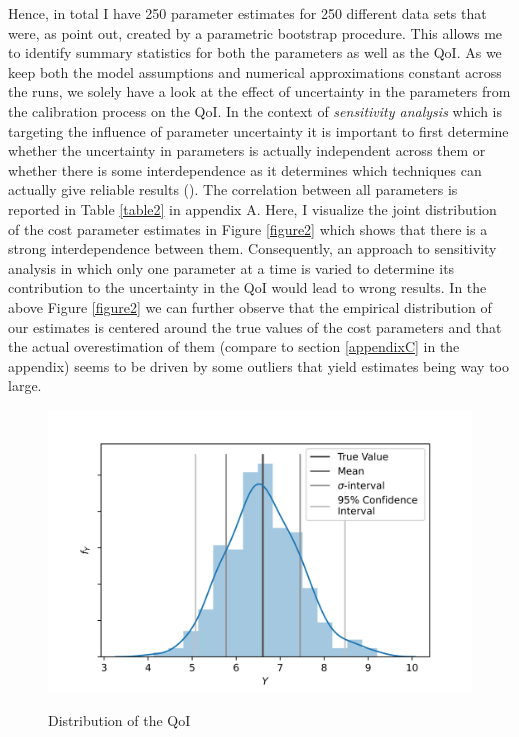 Hence, in total I have 250 parameter estimates for 250 different data sets that were, as \cite{Su.Judd.2012} point out, created by a parametric bootstrap procedure. This allows me to identify summary statistics for both the parameters as well as the QoI. As we keep both the model assumptions and numerical approximations constant across the runs, we solely have a look at the effect of uncertainty in the parameters from the calibration process on the QoI. In the context of \textit{sensitivity analysis} which is targeting the influence of parameter uncertainty it is important to first determine whether the uncertainty in parameters is actually independent across them or whether there is some interdependence as it determines which techniques can actually give reliable results (\cite{Saltelli.2008}). The correlation between all parameters is reported in Table \ref{table2} in appendix A. Here, I visualize the joint distribution of the cost parameter estimates in Figure \ref{figure2} which shows that there is a strong interdependence between them. Consequently, an approach to sensitivity analysis in which only one parameter at a time is varied to determine its contribution to the uncertainty in the QoI would lead to wrong results. In the above Figure \ref{figure2} we can further observe that the empirical distribution of our estimates is centered around the true values of the cost parameters and that the actual overestimation of them (compare to section \ref{appendixC} in the appendix) seems to be driven by some outliers that yield estimates being way too large.

\begin{figure}[!t]
	\caption{Distribution of the QoI}
	\vspace*{-4mm}
	\centering
	\includegraphics[scale=0.9]{../figures/figure_3.png}
	\label{figure3}
\end{figure}

